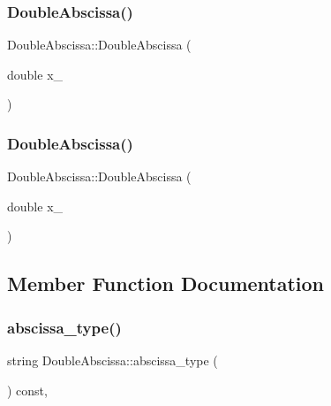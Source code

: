\subsubsection{\texorpdfstring{DoubleAbscissa()}{DoubleAbscissa()}\hspace{0.1cm}{\footnotesize\ttfamily [1/2]}}
{\footnotesize\ttfamily Double\+Abscissa\+::\+Double\+Abscissa (\begin{DoxyParamCaption}\item[{double}]{x\+\_\+ }\end{DoxyParamCaption})\hspace{0.3cm}{\ttfamily [inline]}}

\mbox{\label{classDoubleAbscissa_a5016607adef916326df008884eb3ed07}} 
\subsubsection{\texorpdfstring{DoubleAbscissa()}{DoubleAbscissa()}\hspace{0.1cm}{\footnotesize\ttfamily [2/2]}}
{\footnotesize\ttfamily Double\+Abscissa\+::\+Double\+Abscissa (\begin{DoxyParamCaption}\item[{double}]{x\+\_\+ }\end{DoxyParamCaption})\hspace{0.3cm}{\ttfamily [inline]}}



\subsection{Member Function Documentation}
\mbox{\label{classDoubleAbscissa_ae69cb78334800cb8477daf2cefb4d67e}} 
\subsubsection{\texorpdfstring{abscissa\_type()}{abscissa\_type()}\hspace{0.1cm}{\footnotesize\ttfamily [1/2]}}
{\footnotesize\ttfamily string Double\+Abscissa\+::abscissa\+\_\+type (\begin{DoxyParamCaption}{ }\end{DoxyParamCaption}) const\hspace{0.3cm}{\ttfamily [inline]}, {\ttfamily [virtual]}}



